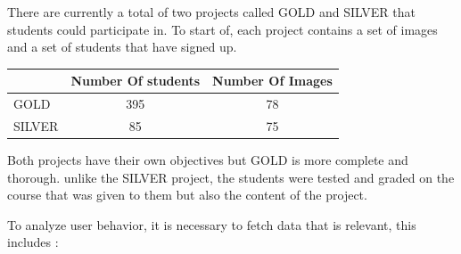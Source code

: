 \documentclass[a4paper,11pt]{report}
\numberwithin{figure}{section} %
\begin{document}
          There are currently a total of two projects called GOLD and SILVER that students could participate in. To start of, each project contains a set of images and a set of students that have signed up.
          
          \begin{center}
          \begin{tabular}{| l | c | c |}
          \hline
           & Number Of students & Number Of Images \\ \hline
           GOLD & 395 & 78 \\ \hline
           SILVER & 85 & 75 \\
          \hline
          \end{tabular}
          \end{center}

		  Both projects have their own objectives but GOLD is more complete and thorough. unlike the SILVER project, the students were tested and graded on the course that was given to them but also the content of the project.
         
          To analyze user behavior, it is necessary to fetch data that is relevant, this includes :
          
\end{document}
